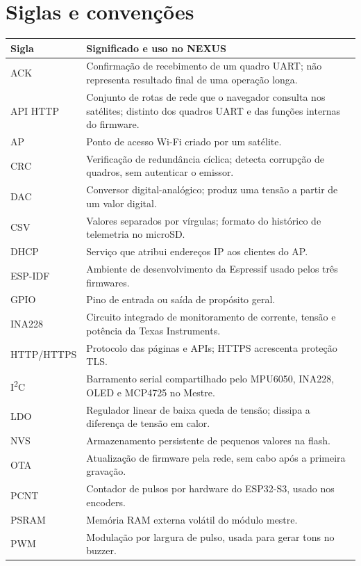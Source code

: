 \documentclass[11pt,a4paper,oneside]{report}
\begin{document}
\chapter*{Siglas e convenções}
\small\begin{longtable}{@{}p{2.5cm}p{13.1cm}@{}}\toprule
Sigla & Significado e uso no NEXUS\\\midrule
ACK & Confirmação de recebimento de um quadro UART; não representa resultado final de uma operação longa.\\
API HTTP & Conjunto de rotas de rede que o navegador consulta nos satélites; distinto dos quadros UART e das funções internas do firmware.\\
AP & Ponto de acesso Wi-Fi criado por um satélite.\\
CRC & Verificação de redundância cíclica; detecta corrupção de quadros, sem autenticar o emissor.\\
DAC & Conversor digital-analógico; produz uma tensão a partir de um valor digital.\\
CSV & Valores separados por vírgulas; formato do histórico de telemetria no microSD.\\
DHCP & Serviço que atribui endereços IP aos clientes do AP.\\
ESP-IDF & Ambiente de desenvolvimento da Espressif usado pelos três firmwares.\\
GPIO & Pino de entrada ou saída de propósito geral.\\
INA228 & Circuito integrado de monitoramento de corrente, tensão e potência da Texas Instruments.\\
HTTP/HTTPS & Protocolo das páginas e APIs; HTTPS acrescenta proteção TLS.\\
I\textsuperscript{2}C & Barramento serial compartilhado pelo MPU6050, INA228, OLED e MCP4725 no Mestre.\\
LDO & Regulador linear de baixa queda de tensão; dissipa a diferença de tensão em calor.\\
NVS & Armazenamento persistente de pequenos valores na flash.\\
OTA & Atualização de firmware pela rede, sem cabo após a primeira gravação.\\
PCNT & Contador de pulsos por hardware do ESP32-S3, usado nos encoders.\\
PSRAM & Memória RAM externa volátil do módulo mestre.\\
PWM & Modulação por largura de pulso, usada para gerar tons no buzzer.\\

\end{longtable}
\end{document}
